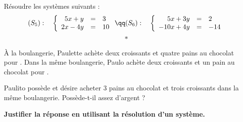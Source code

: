\documentclass[11pt,openright,twoside,french]{book}
\begin{document}
\exo Résoudre les systèmes suivants :
\[
(S_5) :\quad \left\{\begin{array}{rcl}
                                5x + y & = & 3 \\
                                2x - 4y & = & 10
                            \end{array}
                    \right. \qq
(S_6) :\quad \left\{\begin{array}{rcl}
                                5x + 3y & = & 2 \\
                                -10x + 4y & = & -14
                            \end{array}
                    \right.
\]
\[*\]

\exo À la boulangerie, Paulette achète deux croissants et quatre pains au chocolat pour . Dans la même boulangerie, Paulo achète deux croissants et un pain au chocolat pour .\par
Paulito possède  et désire acheter $3$ pains au chocolat et trois croissants dans la même boulangerie. Possède-t-il assez d'argent ?\par
\textbf{Justifier la réponse en utilisant la résolution d'un système.}
                    
\end{document}
